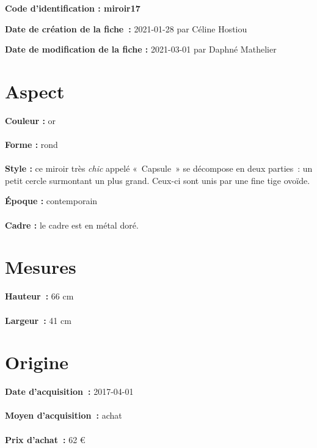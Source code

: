 
     {\bf \huge Code d’identification : miroir17} \\
    \newline \hr \begin{center} 
       
    \end{center} 
    \begin{itemize}
    
    \footnotesize {\item {\bf Date de création de la fiche :} 2021-01-28
    {par Céline Hostiou}} 
    \footnotesize {\item {\bf Date de modification de la fiche :} 2021-03-01
    {par Daphné Mathelier} \\}
    \end{itemize}
   \hr 
    \section* {Aspect} 
    {\bf \large Couleur :} or
    \\ \\ {\bf \large Forme :} rond 
    \\ \\ {\bf \large Style :}  ce miroir très 
    {\em {chic}}
   appelé « Capsule » se décompose en deux parties : un petit cercle
            surmontant un plus grand. Ceux-ci sont unis par une fine tige ovoïde.
         
        {\bf \large Époque :} contemporain 
    \\ \\ {\bf \large Cadre :} le cadre est en métal doré.
         
    \section* {Mesures}
     {\bf \large Hauteur :} 66 cm
   \\ \\ {\bf \large Largeur :} 41 cm 
  
    \section* {Origine}
    {\bf \large Date d’acquisition :} 2017-04-01 \\ \\
    {\bf \large Moyen d’acquisition :} achat \\ \\ {\bf \large Prix d’achat :}
        62 € 
      
